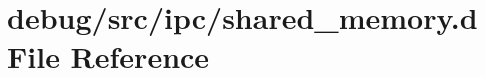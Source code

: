 \hypertarget{shared__memory_8d}{
\section{debug/src/ipc/shared\_\-memory.d File Reference}
\label{shared__memory_8d}
}
